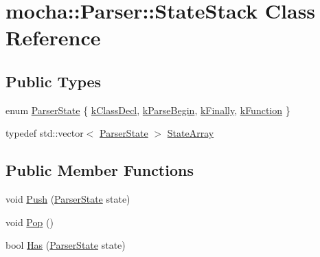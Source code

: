 \hypertarget{classmocha_1_1_parser_1_1_state_stack}{
\section{mocha::Parser::StateStack Class Reference}
\label{classmocha_1_1_parser_1_1_state_stack}
}
\subsection*{Public Types}
\begin{DoxyCompactItemize}
\item 
enum \hyperlink{classmocha_1_1_parser_1_1_state_stack_a3bc1e5c9a89e77ffc0fe304d658e9837}{ParserState} \{ \hyperlink{classmocha_1_1_parser_1_1_state_stack_a3bc1e5c9a89e77ffc0fe304d658e9837a54533ed84c9fdc15682fb33487499078}{kClassDecl}, 
\hyperlink{classmocha_1_1_parser_1_1_state_stack_a3bc1e5c9a89e77ffc0fe304d658e9837a3f059ddf55676a84e72698b29f6ffe28}{kParseBegin}, 
\hyperlink{classmocha_1_1_parser_1_1_state_stack_a3bc1e5c9a89e77ffc0fe304d658e9837aab1643a7fb3d9e5d24902f70aa78f24b}{kFinally}, 
\hyperlink{classmocha_1_1_parser_1_1_state_stack_a3bc1e5c9a89e77ffc0fe304d658e9837a59cd8c9cf0cf5a423740915530147466}{kFunction}
 \}
\item 
typedef std::vector$<$ \hyperlink{classmocha_1_1_parser_1_1_state_stack_a3bc1e5c9a89e77ffc0fe304d658e9837}{ParserState} $>$ \hyperlink{classmocha_1_1_parser_1_1_state_stack_a06d3744ffd5b27d0551fe6ef56cb5e31}{StateArray}
\end{DoxyCompactItemize}
\subsection*{Public Member Functions}
\begin{DoxyCompactItemize}
\item 
void \hyperlink{classmocha_1_1_parser_1_1_state_stack_a9f3c49e94ef303a259e4f2f9a9e2ede6}{Push} (\hyperlink{classmocha_1_1_parser_1_1_state_stack_a3bc1e5c9a89e77ffc0fe304d658e9837}{ParserState} state)
\item 
void \hyperlink{classmocha_1_1_parser_1_1_state_stack_ae854398d6a45c4de53881c9408392141}{Pop} ()
\item 
bool \hyperlink{classmocha_1_1_parser_1_1_state_stack_a61d68cd7356fc54cb5d48aabd0b37099}{Has} (\hyperlink{classmocha_1_1_parser_1_1_state_stack_a3bc1e5c9a89e77ffc0fe304d658e9837}{ParserState} state)
\end{DoxyCompactItemize}
